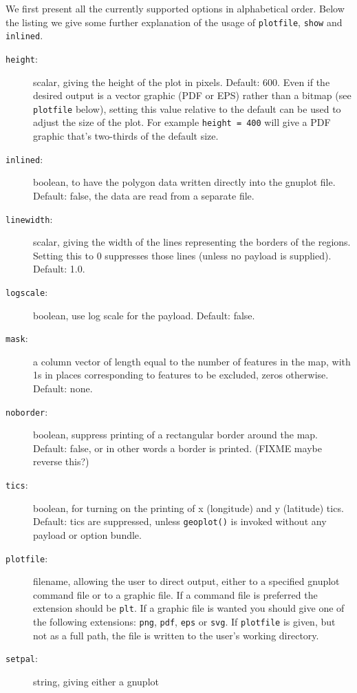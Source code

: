 \documentclass{article}
\begin{document}
We first present all the currently supported options in alphabetical
order. Below the listing we give some further explanation of the usage
of \texttt{plotfile}, \texttt{show} and \texttt{inlined}.

\begin{description}
\item[\texttt{height}:] scalar, giving the height of the plot in
  pixels. Default: 600. Even if the desired output is a vector graphic
  (PDF or EPS) rather than a bitmap (see \texttt{plotfile} below),
  setting this value relative to the default can be used to adjust the
  size of the plot. For example \texttt{height = 400} will give a PDF
  graphic that's two-thirds of the default size.
\item[\texttt{inlined}:] boolean, to have the polygon data written
  directly into the \textsf{gnuplot} file. Default: false, the data
  are read from a separate file.
\item[\texttt{linewidth}:] scalar, giving the width of the lines
  representing the borders of the regions. Setting this to 0
  suppresses those lines (unless no payload is supplied). Default:
  1.0.
\item[\texttt{logscale}:] boolean, use log scale for the
  payload. Default: false.
\item[\texttt{mask}:] a column vector of length equal to the number of
  features in the map, with 1s in places corresponding to features to
  be excluded, zeros otherwise. Default: none.
\item[\texttt{noborder}:] boolean, suppress printing of a rectangular
  border around the map. Default: false, or in other words a border is
  printed. (FIXME maybe reverse this?)
\item[\texttt{tics}:] boolean, for turning on the printing of x
  (longitude) and y (latitude) tics. Default: tics are suppressed,
  unless \texttt{geoplot()} is invoked without any payload or option
  bundle.
\item[\texttt{plotfile}:] filename, allowing the user to direct
  output, either to a specified \textsf{gnuplot} command file or to a
  graphic file. If a command file is preferred the extension should be
  \texttt{plt}. If a graphic file is wanted you should give one of the
  following extensions: \texttt{png}, \texttt{pdf}, \texttt{eps} or
  \texttt{svg}.  If \texttt{plotfile} is given, but not as a full
  path, the file is written to the user's working directory.
\item[\texttt{setpal}:] string, giving either a \textsf{gnuplot}

\end{description}
\end{document}
